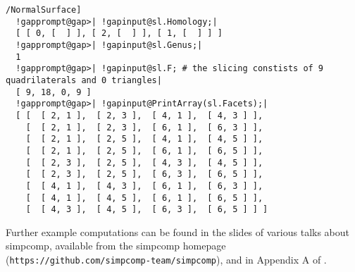 \documentclass[a4paper,11pt]{report}
\begin{document}
{{\begin{Verbatim}[commandchars=!@|,fontsize=\small,frame=single,label=Example]
  /NormalSurface]
  !gapprompt@gap>| !gapinput@sl.Homology;|
  [ [ 0, [  ] ], [ 2, [  ] ], [ 1, [  ] ] ]
  !gapprompt@gap>| !gapinput@sl.Genus;|
  1
  !gapprompt@gap>| !gapinput@sl.F; # the slicing constists of 9 quadrilaterals and 0 triangles|
  [ 9, 18, 0, 9 ]
  !gapprompt@gap>| !gapinput@PrintArray(sl.Facets);|
  [ [  [ 2, 1 ],  [ 2, 3 ],  [ 4, 1 ],  [ 4, 3 ] ],
    [  [ 2, 1 ],  [ 2, 3 ],  [ 6, 1 ],  [ 6, 3 ] ],
    [  [ 2, 1 ],  [ 2, 5 ],  [ 4, 1 ],  [ 4, 5 ] ],
    [  [ 2, 1 ],  [ 2, 5 ],  [ 6, 1 ],  [ 6, 5 ] ],
    [  [ 2, 3 ],  [ 2, 5 ],  [ 4, 3 ],  [ 4, 5 ] ],
    [  [ 2, 3 ],  [ 2, 5 ],  [ 6, 3 ],  [ 6, 5 ] ],
    [  [ 4, 1 ],  [ 4, 3 ],  [ 6, 1 ],  [ 6, 3 ] ],
    [  [ 4, 1 ],  [ 4, 5 ],  [ 6, 1 ],  [ 6, 5 ] ],
    [  [ 4, 3 ],  [ 4, 5 ],  [ 6, 3 ],  [ 6, 5 ] ] ]
\end{Verbatim}
}

 Further example computations can be found in the slides of various talks about \textsf{simpcomp}, available from the \textsf{simpcomp} homepage (\texttt{https://github.com/simpcomp-team/simpcomp}), and in Appendix A of \cite{Spreer10Diss}. }

 
\end{document}
